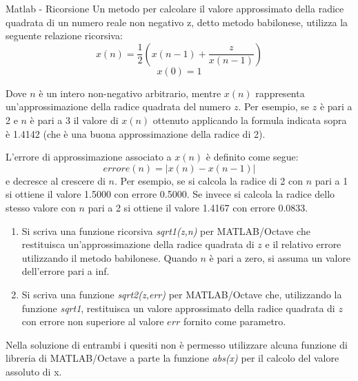 \documentclass[aspectratio=169, ]{beamer}
\begin{document}
\begin{frame}[allowframebreaks]{Matlab - Ricorsione}
    Un metodo per calcolare il valore approssimato della radice quadrata di un
    numero reale non negativo z, detto metodo babilonese, utilizza la seguente
    relazione ricorsiva:
    \[x(n) = \frac{1}{2}(x(n-1)+\frac{z}{x(n-1)})\]
    \[x(0)=1\]

    Dove $n$ è un intero non-negativo arbitrario, mentre $x(n)$ rappresenta un'approssimazione della radice quadrata del numero $z$. Per esempio, se $z$ è pari a 2 e $n$ è pari a 3 il valore di $x(n)$ ottenuto applicando la formula indicata sopra è 1.4142 (che è una buona approssimazione della radice di 2).

    \framebreak

    L'errore di approssimazione associato a $x(n)$ è definito come segue:
    \[errore(n) = | x(n) - x(n-1)|\]
    e decresce al crescere di $n$. Per esempio, se si calcola la radice di 2 con $n$ pari a 1 si ottiene il valore 1.5000 con errore 0.5000. Se invece si calcola la radice dello stesso valore con $n$ pari a 2 si ottiene il valore 1.4167 con errore 0.0833.

    \framebreak

    \begin{enumerate}
        \item Si scriva una funzione ricorsiva \emph{sqrt1(z,n)} per MATLAB/Octave che
            restituisca un'approssimazione della radice quadrata di $z$ e il relativo errore utilizzando il metodo babilonese. Quando $n$ è pari a zero, si assuma un valore dell’errore pari a inf.
        \item Si scriva una funzione \emph{sqrt2(z,err)} per MATLAB/Octave che, utilizzando la funzione \emph{sqrt1}, restituisca un valore approssimato della radice quadrata di $z$ con errore non superiore al valore $err$ fornito come parametro.
    \end{enumerate}

    Nella soluzione di entrambi i quesiti non è permesso utilizzare alcuna funzione di
    libreria di MATLAB/Octave a parte la funzione \emph{abs(x)} per il calcolo del valore
    assoluto di x.
\end{frame}
\end{document}
